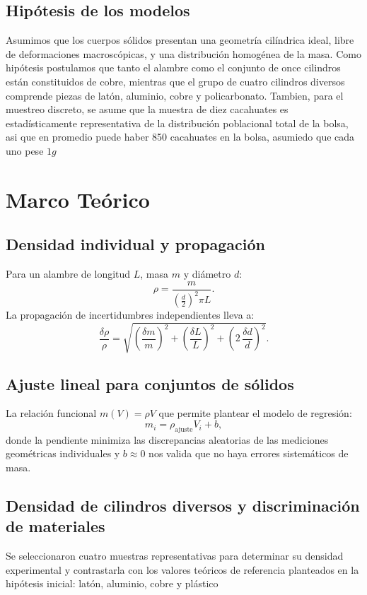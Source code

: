 \documentclass[10pt, letterpaper, twocolumn]{article}
\begin{document}
\subsection{Hipótesis de los modelos}
Asumimos que los cuerpos sólidos presentan una geometría cilíndrica ideal, libre de deformaciones macroscópicas, y una distribución homogénea de la masa. Como hipótesis postulamos que tanto el alambre como el conjunto de once cilindros están constituidos de cobre, mientras que el grupo de cuatro cilindros diversos comprende piezas de latón, aluminio, cobre y policarbonato. Tambien, para el muestreo discreto, se asume que la muestra de diez cacahuates es estadísticamente representativa de la distribución poblacional total de la bolsa, asi que en promedio puede haber 850 cacahuates en la bolsa, asumiedo que cada uno pese $1g$

\section{Marco Teórico}
\subsection{Densidad individual y propagación}
Para un alambre de longitud $L$, masa $m$ y diámetro $d$:
\begin{equation}
    \rho = \frac{m}{\left(\frac{d}{2}\right)^2\pi L}.
    \label{eq:densidad_alambre}
\end{equation}
La propagación de incertidumbres independientes lleva a:
\begin{equation}
    \frac{\delta \rho}{\rho} = \sqrt{\left(\frac{\delta m}{m}\right)^2 + \left(\frac{\delta L}{L}\right)^2 + \left(2\,\frac{\delta d}{d}\right)^2}.
    \label{eq:error_relativo}
\end{equation}

\subsection{Ajuste lineal para conjuntos de sólidos}
La relación funcional $m(V) = \rho V$ que permite plantear el modelo de regresión:
\begin{equation}
    m_i = \rho_{\mathrm{ajuste}} V_i + b,
    \label{eq:lineal}
\end{equation}
donde la pendiente minimiza las discrepancias aleatorias de las mediciones geométricas individuales y $b \approx 0$ nos valida que no haya errores sistemáticos de masa.

\subsection{Densidad de cilindros diversos y discriminación de materiales}
Se seleccionaron cuatro muestras representativas para determinar su densidad experimental y contrastarla con los valores teóricos de referencia planteados en la hipótesis inicial: latón, aluminio, cobre y plástico
\end{document}
